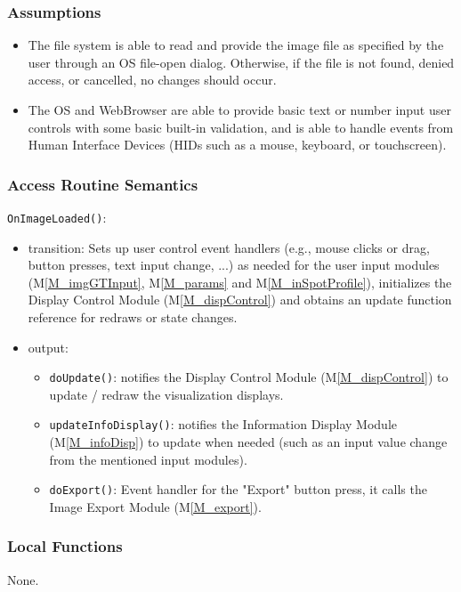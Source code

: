 \documentclass[12pt, titlepage]{article}
\newcommand{\mref}[1]{M\ref{#1}}
\newcommand{\mrefp}[1]{(\mref{#1})}
\newcommand{\mreff}[1]{Module \mrefp{#1}}
\newcommand{\code}[1]{\texttt{#1}}
\begin{document}
\subsubsection{Assumptions}
\begin{itemize}
  \item The file system is able to read and provide the image file as specified by the user through an OS file-open dialog.
  Otherwise, if the file is not found, denied access, or cancelled, no changes should occur.
  \item The OS and WebBrowser are able to provide basic text or number input user controls with some basic built-in validation,
  and is able to handle events from Human Interface Devices (HIDs such as a mouse, keyboard, or touchscreen).
\end{itemize}

\subsubsection{Access Routine Semantics}

\noindent \code{OnImageLoaded()}:
\begin{itemize}
  \item transition: Sets up user control event handlers (e.g., mouse clicks or drag, button presses, text input change, ...)
    as needed for the user input modules (\mref{M_imgGTInput}, \mref{M_params} and \mref{M_inSpotProfile}),
    initializes the Display Control \mreff{M_dispControl} and obtains an update function reference for redraws or state changes.
  \item output: 
    \begin{itemize}
      \item \code{doUpdate()}: notifies the Display Control \mreff{M_dispControl} to update / redraw the visualization displays.
      \item \code{updateInfoDisplay()}: notifies the Information Display \mreff{M_infoDisp} to update when needed (such as
      an input value change from the mentioned input modules).
      \item \code{doExport()}: Event handler for the "Export" button press, it calls the Image Export \mreff{M_export}.
    \end{itemize}
\end{itemize}

\subsubsection{Local Functions}
None.
\end{document}
